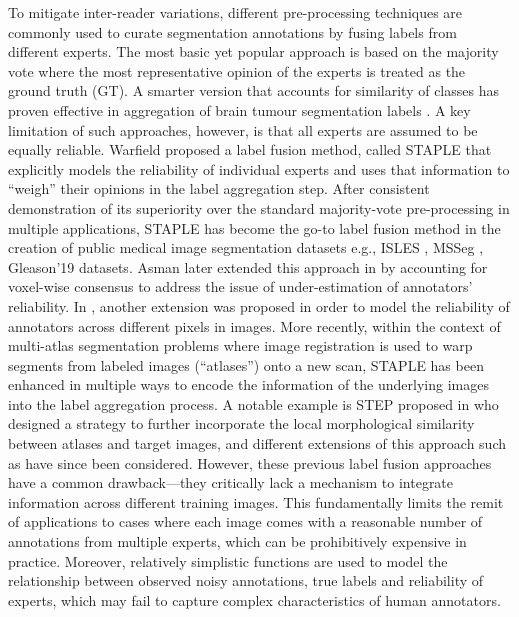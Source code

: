 To mitigate inter-reader variations, different pre-processing techniques are commonly used to curate segmentation annotations by fusing labels from different experts. The most basic yet popular approach is based on the majority vote where the most representative opinion of the experts is treated as the ground truth (GT). A smarter version that accounts for similarity of classes has proven effective in aggregation of brain tumour segmentation labels \cite{menze2014multimodal}. A key limitation of such approaches, however, is that all experts are assumed to be equally reliable. Warfield \cite{warfield2004simultaneous} proposed a label fusion method, called STAPLE that explicitly models the reliability of individual experts and uses that information to ``weigh'' their opinions in the label aggregation step. After consistent demonstration of its superiority over the standard majority-vote pre-processing in multiple applications, STAPLE has become the go-to label fusion method in the creation of public medical image segmentation datasets e.g., ISLES \cite{winzeck2018isles}, MSSeg \cite{commowick2018objective}, Gleason'19 \cite{gleason2019} datasets. Asman later extended this approach in \cite{asman2011robust} by accounting for voxel-wise consensus to address the issue of under-estimation of annotators' reliability. In \cite{asman2012formulating}, another extension was proposed in order to model the reliability of annotators across different pixels in images. More recently, within the context of multi-atlas segmentation problems \cite{iglesias2013unified} where image registration is used to warp segments from labeled images (``atlases'') onto a new scan, STAPLE has been enhanced in multiple ways to encode the information of the underlying images into the label aggregation process. A notable example is STEP proposed in \cite{cardoso2013steps} who designed a strategy to further incorporate the local morphological similarity between atlases and target images, and different extensions of this approach such as \cite{asman2013non,akhondi2014logarithmic} have since been considered. However, these previous label fusion approaches have a common drawback---they critically lack a mechanism to integrate information across different training images. This fundamentally limits the remit of applications to cases where each image comes with a reasonable number of annotations from multiple experts, which can be prohibitively expensive in practice. Moreover, relatively simplistic functions are used to model the relationship between observed noisy annotations, true labels and reliability of experts, which may fail to capture complex characteristics of human annotators.

